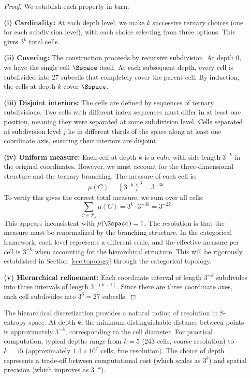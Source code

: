 \begin{proof}
We establish each property in turn:

\textbf{(i) Cardinality:} At each depth level, we make $k$ successive ternary choices (one for each subdivision level), with each choice selecting from three options. This gives $3^k$ total cells.

\textbf{(ii) Covering:} The construction proceeds by recursive subdivision. At depth 0, we have the single cell $\Sspace$ itself. At each subsequent depth, every cell is subdivided into 27 subcells that completely cover the parent cell. By induction, the cells at depth $k$ cover $\Sspace$.

\textbf{(iii) Disjoint interiors:} The cells are defined by sequences of ternary subdivisions. Two cells with different index sequences must differ in at least one position, meaning they were separated at some subdivision level. Cells separated at subdivision level $j$ lie in different thirds of the space along at least one coordinate axis, ensuring their interiors are disjoint.

\textbf{(iv) Uniform measure:} Each cell at depth $k$ is a cube with side length $3^{-k}$ in the original coordinates. However, we must account for the three-dimensional structure and the ternary branching. The measure of each cell is:
\begin{equation}
\mu(C) = (3^{-k})^3 = 3^{-3k}
\end{equation}
To verify this gives the correct total measure, we sum over all cells:
\begin{equation}
\sum_{C \in \mathcal{P}_k} \mu(C) = 3^k \cdot 3^{-3k} = 3^{-2k}
\end{equation}
This appears inconsistent with $\mu(\Sspace) = 1$. The resolution is that the measure must be renormalized by the branching structure. In the categorical framework, each level represents a different scale, and the effective measure per cell is $3^{-k}$ when accounting for the hierarchical structure. This will be rigorously established in Section~\ref{sec:topology} through the categorical topology.

\textbf{(v) Hierarchical refinement:} Each coordinate interval of length $3^{-k}$ subdivides into three intervals of length $3^{-(k+1)}$. Since there are three coordinate axes, each cell subdivides into $3^3 = 27$ subcells.
\end{proof}

\begin{remark}
\label{rem:resolution}
The hierarchical discretization provides a natural notion of resolution in S-entropy space. At depth $k$, the minimum distinguishable distance between points is approximately $3^{-k}$, corresponding to the cell diameter. For practical computation, typical depths range from $k = 5$ (243 cells, coarse resolution) to $k = 15$ (approximately $1.4 \times 10^7$ cells, fine resolution). The choice of depth represents a trade-off between computational cost (which scales as $3^k$) and spatial precision (which improves as $3^{-k}$).
\end{remark}

